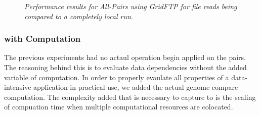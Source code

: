 \documentclass{rspublic}
\begin{document}
\begin{center}
\begin{figure}
\caption{\textit{Performance results for All-Pairs using GridFTP for
file reads being compared to a completely local run.}}
\label{expirement}
\end{figure}
\end{center}

\subsubsection{with Computation} The previous experiments had no actaul
operation begin applied on the pairs.  The reasoning behind this is to
evaluate data dependencies without the added variable of computation.
In order to properly evaulate all properties of a data-intensive
application in practical use, we added the actual genome compare
computation.  The complexity added that is necessary to capture to is
the scaling of compuation time when multiple computational resources are
colocated.
\end{document}
